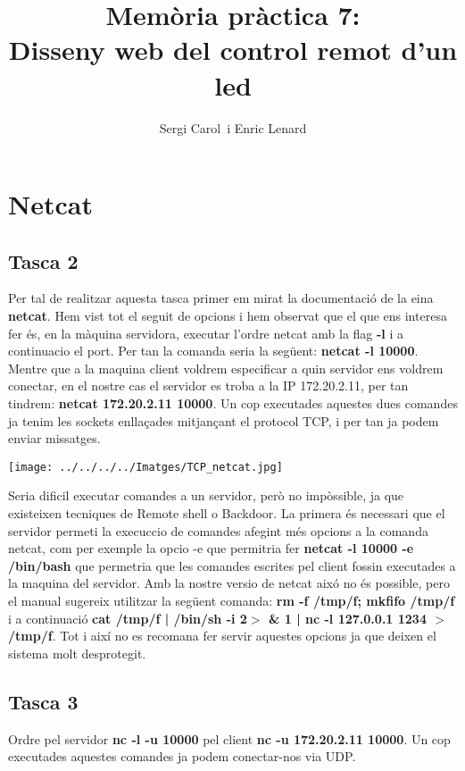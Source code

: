 \documentclass[11p]{article}
\title{\huge\textbf{ Memòria pràctica 7:\\ Disseny web del control remot d'un led}}
\author{Sergi Carol\ i Enric Lenard }
\begin{document}
\maketitle


\section{Netcat}
\subsection{Tasca 2}

Per tal de realitzar aquesta tasca primer em mirat la documentació de la eina \textbf{netcat}. Hem vist tot el seguit de opcions i hem observat que el que ens interesa fer és, en la màquina servidora, executar l'ordre netcat amb la flag \textbf{-l} i a continuacio el port. Per tan la comanda seria la següent: \textbf{netcat -l 10000}. Mentre  que a la maquina client voldrem especificar a quin servidor ens voldrem conectar, en el nostre cas el servidor es troba a la IP 172.20.2.11, per tan tindrem: \textbf{netcat 172.20.2.11 10000}.
\newline
Un cop executades aquestes dues comandes ja tenim les sockets enllaçades mitjançant el protocol TCP, i per tan ja podem enviar missatges.
\newline
\centerline{\texttt{[image: ../../../../Imatges/TCP\_netcat.jpg]}} 
\newline
\newline
Seria dificil executar comandes a un servidor, però no impòssible, ja que existeixen tecniques de Remote shell o Backdoor. La primera és necessari que el servidor permeti la execuccio de comandes afegint més opcions a la comanda netcat, com per exemple la opcio -e que permitria fer \textbf{netcat -l 10000 -e /bin/bash} que permetria que les comandes escrites pel client fossin executades a la maquina del servidor. Amb la nostre versio de netcat aixó no és possible, pero el manual sugereix utilitzar la següent comanda: \textbf{rm -f /tmp/f; mkfifo /tmp/f} i a continuació \textbf{cat /tmp/f | /bin/sh -i 2$>$ \& 1 | nc -l 127.0.0.1 1234 $>$ /tmp/f}. Tot i així no es recomana fer servir aquestes opcions ja que deixen el sistema molt desprotegit.


\subsection{Tasca 3}

Ordre pel servidor \textbf{nc -l -u 10000} pel client \textbf{nc -u 172.20.2.11 10000}. Un cop executades aquestes comandes ja podem conectar-nos via UDP.
\end{document}
